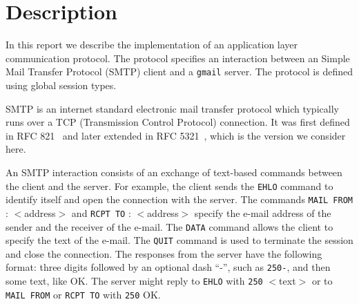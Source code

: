 \section{Description}

In this report we describe the implementation of
an application layer communication protocol.
The protocol specifies an interaction between
an Simple Mail Transfer Protocol (SMTP) client and a \lstinline|gmail| server.
The protocol is defined using global session types.

{SMTP} is an internet standard
electronic mail transfer protocol which typically runs over a TCP
(Transmission Control Protocol) connection.
It was first defined in RFC
821~\cite{SMTP-rfc} and later extended in RFC 5321~\cite{ESMTP-rfc},
which is the version we consider here.
%

An SMTP interaction consists of an exchange of text-based {commands}
between the client and the server.
For example, the client sends the
\lstinline|EHLO| command to identify itself and open the connection with
the server.
%
The commands \lstinline|MAIL FROM| : $<$address$>$ and \lstinline|RCPT TO| : $<$address$>$
specify the e-mail address of the sender and the
receiver of the e-mail.
%
The \lstinline|DATA| command allows the client to specify the text of
the e-mail. The \lstinline|QUIT| command is used to terminate the
session and close the connection. The responses from the server have the
following format: three digits followed by an optional dash ``-'', such
as \lstinline|250-|, and then some text, like OK. The server might reply
to \lstinline|EHLO| with \lstinline|250| $<$text$>$ or to
\lstinline|MAIL FROM| or \lstinline|RCPT TO| with \lstinline|250| OK.

